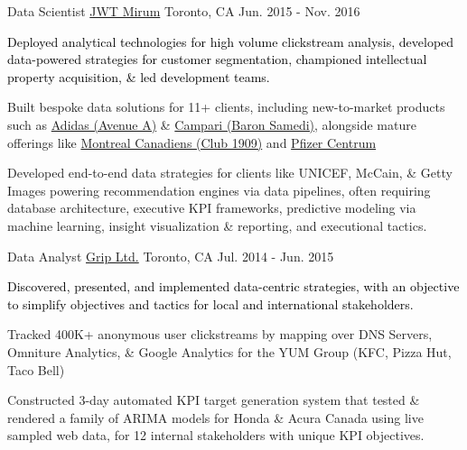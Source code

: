 \begin{cventries}
	\cventry
	{Data Scientist} %
	{\href{https://www.mirumagency.com/en/home}{JWT Mirum}} %
	{Toronto, CA} %
	{Jun. 2015 - Nov. 2016} %
	{
		\textcolor{black}{Deployed analytical technologies for high volume clickstream analysis, developed data-powered strategies for customer segmentation, championed intellectual property acquisition, \& led development teams.}
		\textcolor{text}{
			\begin{cvitems} %
				\item {Built bespoke data solutions for 11+ clients, including new-to-market products such as \href{https://www.adidasavenuea.com/}{Adidas (Avenue A)} \&  \href{http://www.baronsamedi.com/}{Campari (Baron Samedi)}, alongside mature offerings like \href{https://www.club1909.com/}{Montreal Canadiens (Club 1909)} and \href{https://www.centrum.ca/}{Pfizer Centrum}}
				\item {Developed end-to-end data strategies for clients like UNICEF, McCain, \& Getty Images powering recommendation engines via data pipelines, often requiring database architecture, executive KPI frameworks, predictive modeling via machine learning, insight visualization \& reporting, and executional tactics.}
			\end{cvitems}
			\newline
		}
	}

	\cventry
	{Data Analyst} %
	{\href{https://www.griplimited.com/}{Grip Ltd.}} %
	{Toronto, CA} %
	{Jul. 2014 - Jun. 2015} %
	{
		\textcolor{black}{Discovered, presented, and implemented data-centric strategies, with an objective to simplify objectives and tactics for local and international stakeholders.}
		\textcolor{text}{
			\begin{cvitems} %
				\item {Tracked 400K+ anonymous user clickstreams by mapping over DNS Servers, Omniture Analytics, \& Google Analytics for the YUM Group (KFC, Pizza Hut, Taco Bell)}
				\item {Constructed 3-day automated KPI target generation system that tested \& rendered a family of ARIMA models for Honda \& Acura Canada using live sampled web data, for 12 internal stakeholders with unique KPI objectives.}
			\end{cvitems}
		}
	}


\end{cventries}
